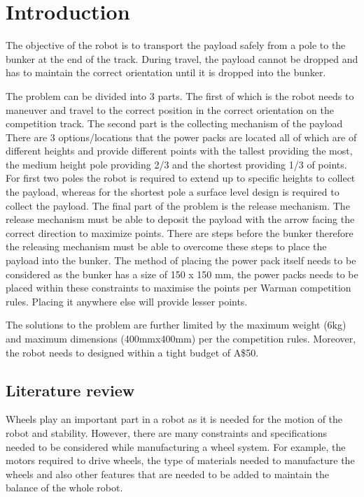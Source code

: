 \documentclass[12pt]{report}
\begin{document}
\chapter{Introduction}

The objective of the robot is to transport the payload safely from a pole to the bunker at the end of the track. During travel, the payload cannot be dropped and has to maintain the correct orientation until it is dropped into the bunker.

The problem can be divided into 3 parts. The first of which is the robot needs to maneuver and travel to the correct position in the correct orientation on the competition track. The second part is the collecting mechanism of the payload There are 3 options/locations that the power packs are located all of which are of different heights and provide different points with the tallest providing the most, the medium height pole providing 2/3 and the shortest providing 1/3 of points. For first two poles the robot is required to extend up to specific heights to collect the payload, whereas for the shortest pole a surface level design is required to collect the payload. The final part of the problem is the release mechanism. The release mechanism must be able to deposit the payload with the arrow facing the correct direction to maximize points. There are steps before the bunker therefore the releasing mechanism must be able to overcome these steps to place the payload into the bunker. The method of placing the power pack itself needs to be considered as the bunker has a size of 150 x 150 mm, the power packs needs to be placed within these constraints to maximise the points per Warman competition rules. Placing it anywhere else will provide lesser points.


The solutions to the problem are further limited by the maximum weight (6kg) and maximum dimensions (400mmx400mm) per the competition rules. Moreover, the robot needs to designed within a tight budget of A\$50.

\pagebreak
 

\section{Literature review} 
 Wheels play an important part in a robot as it is needed for the motion of the robot and stability. However, there are many constraints and specifications needed to be considered while manufacturing a wheel system. For example, the motors required to drive wheels, the type of materials needed to manufacture the wheels and also other features that are needed to be added to maintain the balance of the whole robot.
 
\end{document}
